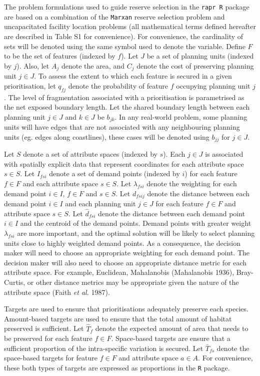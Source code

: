 \documentclass[11pt,]{article}
\begin{document}
The problem formulations used to guide reserve selection in the
\texttt{rapr R} package are based on a combination of the
\texttt{Marxan} reserve selection problem and uncapacitated facility
location problems (all mathematical terms defined hereafter are
described in Table S1 for convenience). For convenience, the cardinality
of sets will be denoted using the same symbol used to denote the
variable. Define $F$ to be the set of features (indexed by $f$). Let $J$
be a set of planning units (indexed by $j$). Also, let $A_j$ denote the
area, and $C_j$ denote the cost of preserving planning unit $j \in J$.
To assess the extent to which each feature is secured in a given
prioritisation, let $q_{fj}$ denote the probability of feature $f$
occupying planning unit $j$. The level of fragmentation associated with
a prioritisation is parametrised as the net exposed boundary length. Let
the shared boundary length between each planning unit $j \in J$ and
$k \in J$ be $b_{jk}$. In any real-world problem, some planning units
will have edges that are not associated with any neighbouring planning
units (eg. edges along coastlines), these cases will be denoted using
$b_{jj}$ for $j \in J$.

Let $S$ denote a set of attribute spaces (indexed by $s$). Each
$j \in J$ is associated with spatially explicit data that represent
coordinates for each attribute space $s \in S$. Let $I_{fsi}$ denote a
set of demand points (indexed by $i$) for each feature $f \in F$ and
each attribute space $s \in S$. Let $\lambda_{fsi}$ denote the weighting
for each demand point $i \in I$, $f \in F$ and $s \in S$. Let $d_{fsij}$
denote the distance between each demand point $i \in I$ and each
planning unit $j \in J$ for each feature $f \in F$ and attribute space
$s \in S$. Let $\hat{d}_{fsi}$ denote the distance between each demand
point $i \in I$ and the centroid of the demand points. Demand points
with greater weight $\lambda_{fsi}$ are more important, and the optimal
solution will be likely to select planning units close to highly
weighted demand points. As a consequence, the decision maker will need
to choose an appropriate weighting for each demand point. The decision
maker will also need to choose an appropriate distance metric for each
attribute space. For example, Euclidean, Mahalanobis (Mahalanobis 1936),
Bray-Curtis, or other distance metrics may be appropriate given the
nature of the attribute space (Faith \emph{et al.} 1987).

Targets are used to ensure that prioritisations adequately preserve each
species. Amount-based targets are used to ensure that the total amount
of habitat preserved is sufficient. Let $\hat{T}_f$ denote the expected
amount of area that needs to be preserved for each feature $f \in F$.
Space-based targets are ensure that a sufficient proportion of the
intra-specific variation is secured. Let $\bar{T}_{fs}$ denote the
space-based targets for feature $f \in F$ and attribute space $a \in A$.
For convenience, these both types of targets are expressed as
proportions in the \texttt{R} package.
\end{document}
